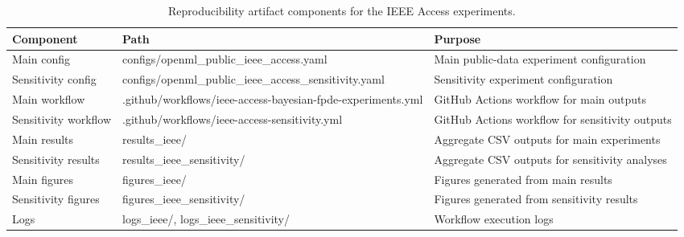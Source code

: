 \begin{table}[t]
\centering
\caption{Reproducibility artifact components for the IEEE Access experiments.}
\label{tab:reproducibility_artifact}
\begin{tabular}{l l l}
        \hline
        Component & Path & Purpose \\
        \hline
        Main config & configs/openml\_public\_ieee\_access.yaml & Main public-data experiment configuration \\
        Sensitivity config & configs/openml\_public\_ieee\_access\_sensitivity.yaml & Sensitivity experiment configuration \\
        Main workflow & .github/workflows/ieee-access-bayesian-fpde-experiments.yml & GitHub Actions workflow for main outputs \\
        Sensitivity workflow & .github/workflows/ieee-access-sensitivity.yml & GitHub Actions workflow for sensitivity outputs \\
        Main results & results\_ieee/ & Aggregate CSV outputs for main experiments \\
        Sensitivity results & results\_ieee\_sensitivity/ & Aggregate CSV outputs for sensitivity analyses \\
        Main figures & figures\_ieee/ & Figures generated from main results \\
        Sensitivity figures & figures\_ieee\_sensitivity/ & Figures generated from sensitivity results \\
        Logs & logs\_ieee/, logs\_ieee\_sensitivity/ & Workflow execution logs \\
        \hline
\end{tabular}
\end{table}
